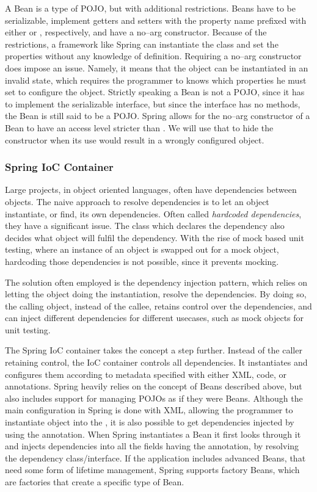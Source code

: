 A Bean is a type of \ac{POJO}, but with additional restrictions.
Beans have to be serializable, implement getters and setters with the property name prefixed with either  or , respectively, and have a no--arg constructor.
Because of the restrictions, a framework like Spring can instantiate the class and set the properties without any knowledge of definition.
Requiring a no--arg constructor does impose an issue.
Namely, it means that the object can be instantiated in an invalid state, which requires the programmer to knows which properties he must set to configure the object.
Strictly speaking a Bean is not a \ac{POJO}, since it has to implement the serializable interface, but since the interface has no methods, the Bean is still said to be a \ac{POJO}.
Spring allows for the no--arg constructor of a Bean to have an access level stricter than .
We will use that to hide the constructor when its use would result in a wrongly configured object.

\subsubsection{Spring IoC Container}
Large projects, in object oriented languages, often have dependencies between objects.
The naive approach to resolve dependencies is to let an object instantiate, or find, its own dependencies.
Often called \textit{hardcoded dependencies}, they have a significant issue.
The class which declares the dependency also decides what object will fulfil the dependency.
With the rise of mock based unit testing, where an instance of an object is swapped out for a mock object, hardcoding those dependencies is not possible, since it prevents mocking.

The solution often employed is the dependency injection pattern, which relies on letting the object doing the instantiation, resolve the dependencies.
By doing so, the calling object, instead of the callee, retains control over the dependencies, and can inject different dependencies for different usecases, such as mock objects for unit testing.

The Spring \ac{IoC} container takes the concept a step further.
Instead of the caller retaining control, the \ac{IoC} container controls all dependencies.
It instantiates and configures them according to metadata specified with either XML, code, or annotations.
Spring heavily relies on the concept of Beans described above, but also includes support for managing \acp{POJO} as if they were Beans.
Although the main configuration in Spring is done with XML, allowing the programmer to instantiate object into the , it is also possible to get dependencies injected by using the  annotation.
When Spring instantiates a Bean it first looks through it and injects dependencies into all the fields having the  annotation, by resolving the dependency class/interface.
If the application includes advanced Beans, that need some form of lifetime management, Spring supports factory Beans, which are factories that create a specific type of Bean.


